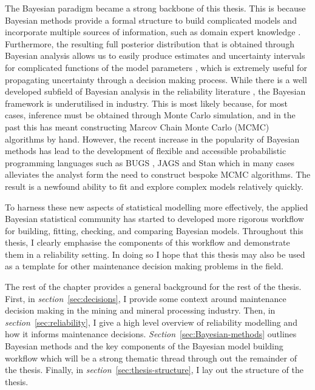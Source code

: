 The Bayesian paradigm became a strong backbone of this thesis. This is because Bayesian methods provide a formal structure to build complicated models and incorporate multiple sources of information, such as domain expert knowledge \citep{meeker2022}. Furthermore, the resulting full posterior distribution that is obtained through Bayesian analysis allows us to easily produce estimates and uncertainty intervals for complicated functions of the model parameters \citep{meeker2022}, which is extremely useful for propagating uncertainty through a decision making process. While there is a well developed subfield of Bayesian analysis in the reliability literature \citep{hamada2008, meeker2022}, the Bayesian framework is underutilised in industry. This is most likely because, for most cases, inference must be obtained through Monte Carlo simulation, and in the past this has meant constructing Marcov Chain Monte Carlo (MCMC) algorithms by hand. However, the recent increase in the popularity of Bayesian methods has lead to the development of flexible and accessible probabilistic programming languages such as BUGS \citep{lunn2012}, JAGS \citep{plummer2003} and Stan \citep{Stan2022} which in many cases alleviates the analyst form the need to construct bespoke MCMC algorithms. The result is a newfound ability to fit and explore complex models relatively quickly.  

To harness these new aspects of statistical modelling more effectively, the applied Bayesian statistical community has started to developed more rigorous workflow for building, fitting, checking, and comparing Bayesian models. Throughout this thesis, I clearly emphasise the components of this workflow and demonstrate them in a reliability setting. In doing so I hope that this thesis may also be used as a template for other maintenance decision making problems in the field.

The rest of the chapter provides a general background for the rest of the thesis. First, in \textit{section}~\ref{sec:decisions}, I provide some context around maintenance decision making in the mining and mineral processing industry. Then, in \textit{section}~\ref{sec:reliability}, I give a high level overview of reliability modelling and how it informs maintenance decisions. \textit{Section}~\ref{sec:Bayesian-methods} outlines Bayesian methods and the key components of the Bayesian model building workflow which will be a strong thematic thread through out the remainder of the thesis. Finally, in \textit{section}~\ref{sec:thesis-structure}, I lay out the structure of the thesis.

